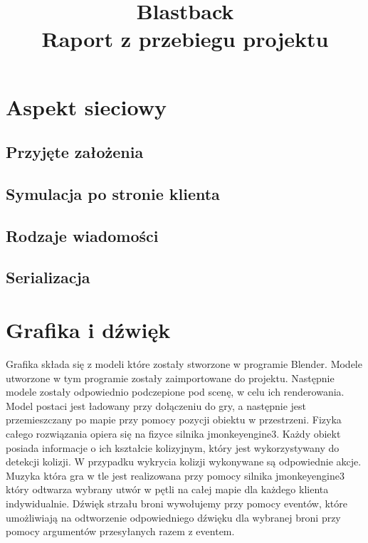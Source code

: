 \documentclass[]{report}
\begin{document}
\title{Blastback \\
	\Large Raport z przebiegu projektu}
\maketitle



\chapter*{Aspekt sieciowy}
\section{Przyjęte założenia}
\section{Symulacja po stronie klienta}
\section{Rodzaje wiadomości}
\section{Serializacja}



\chapter*{Grafika i dźwięk}
	Grafika składa się z modeli które zostały stworzone w programie Blender.
	Modele utworzone w tym programie zostały zaimportowane do projektu.
	Następnie modele zostały odpowiednio podczepione pod scenę, w celu ich renderowania.
	Model postaci jest ładowany przy dołączeniu do gry, a następnie jest przemieszczany po mapie przy pomocy pozycji obiektu w przestrzeni.
	Fizyka całego rozwiązania opiera się na fizyce silnika jmonkeyengine3.
	Każdy obiekt posiada informacje o ich kształcie kolizyjnym, który jest wykorzystywany do detekcji kolizji.
	W przypadku wykrycia kolizji wykonywane są odpowiednie akcje.
	Muzyka która gra w tle jest realizowana przy pomocy silnika jmonkeyengine3 który odtwarza wybrany utwór w pętli na całej mapie dla każdego klienta indywidualnie.
	Dźwięk strzału broni wywołujemy przy pomocy eventów, które umożliwiają na odtworzenie odpowiedniego dźwięku dla wybranej broni przy pomocy argumentów przesyłanych razem z eventem.
\end{document}
